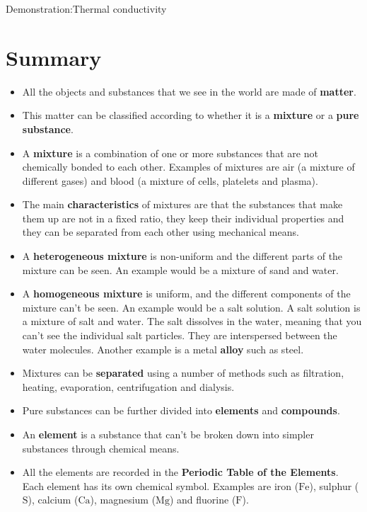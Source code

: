 \begin{gexperiment}{Demonstration:Thermal conductivity}
            \section{Summary}
            \nopagebreak
      \label{m38706*id67458}\begin{itemize}[noitemsep]
            \label{m38706*uid114}\item All the objects and substances that we see in the world are made of \textbf{matter}.
\label{m38706*uid115}\item This matter can be classified according to whether it is a \textbf{mixture} or a \textbf{pure substance}.
\label{m38706*uid116}\item A \textbf{mixture} is a combination of one or more substances that are not chemically bonded to each other. Examples of mixtures are air (a mixture of different gases) and blood (a mixture of cells, platelets and plasma).
\label{m38706*uid117}\item The main \textbf{characteristics} of mixtures are that the substances that make them up are not in a fixed ratio, they keep their individual properties and they can be separated from each other using mechanical means.
\label{m38706*uid118}\item A \textbf{heterogeneous mixture} is non-uniform and the different parts of the mixture can be seen. An example would be a mixture of sand and water.
\label{m38706*uid119}\item A \textbf{homogeneous mixture} is uniform, and the different components of the mixture can't be seen. An example would be a salt solution. A salt solution is a mixture of salt and water. The salt dissolves in the water, meaning that you can't see the individual salt particles. They are interspersed between the water molecules. Another example is a metal \textbf{alloy} such as steel.
\label{m38706*uid120}\item Mixtures can be \textbf{separated} using a number of methods such as filtration, heating, evaporation, centrifugation and dialysis.
\label{m38706*uid121}\item Pure substances can be further divided into \textbf{elements} and \textbf{compounds}.
\label{m38706*uid122}\item An \textbf{element} is a substance that can't be broken down into simpler substances through chemical means.
\label{m38706*uid123}\item All the elements are recorded in the \textbf{Periodic Table of the Elements}. Each element has its own chemical symbol. Examples are iron ($\mathrm{Fe}$), sulphur ($\mathrm{S}$), calcium ($\mathrm{Ca}$), magnesium ($\mathrm{Mg}$) and fluorine ($\mathrm{F}$).

\end{itemize}
\end{gexperiment}
